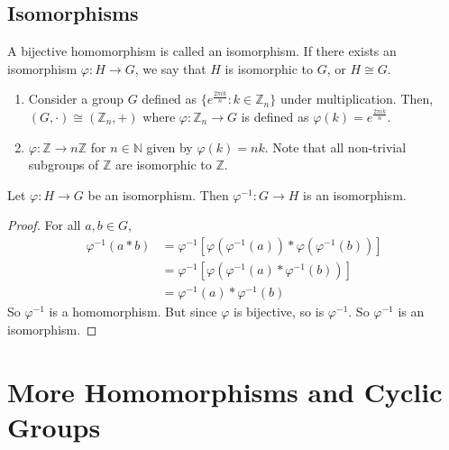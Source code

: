 \documentclass{article}
\begin{document}
\subsection{Isomorphisms}
A bijective homomorphism is called an isomorphism. If there exists an isomorphism $\varphi: H \to G$, we say that $H$ is isomorphic to $G$, or $H \cong G$.
\begin{enumerate}
    \item Consider a group $G$ defined as $\{ e^{\frac{2 \pi i k}{n}} : k \in \mathbb Z_n \}$ under multiplication. Then, $(G, \cdot) \cong (\mathbb Z_n, +)$ where $\varphi: \mathbb Z_n \to G$ is defined as $\varphi(k) = e^{\frac{2\pi i k}{n}}$.
    \item $\varphi: \mathbb Z \to n\mathbb Z$ for $n \in \mathbb N$ given by $\varphi(k) = nk$. Note that all non-trivial subgroups of $\mathbb Z$ are isomorphic to $\mathbb Z$.
\end{enumerate}

\begin{proposition}
    Let $\varphi: H \to G$ be an isomorphism. Then $\varphi^{-1}: G \to H$ is an isomorphism.
\end{proposition}
\begin{proof}
    For all $a, b \in G$,
    \begin{align*}
        \varphi^{-1}(a \ast b) & = \varphi^{-1}\left[ \varphi(\varphi^{-1}(a)) \ast \varphi(\varphi^{-1}(b)) \right] \\
                               & = \varphi^{-1}\left[ \varphi(\varphi^{-1}(a) \ast \varphi^{-1}(b)) \right]          \\
                               & = \varphi^{-1}(a) \ast \varphi^{-1}(b)
    \end{align*}
    So $\varphi^{-1}$ is a homomorphism. But since $\varphi$ is bijective, so is $\varphi^{-1}$. So $\varphi^{-1}$ is an isomorphism.
\end{proof}

\section{More Homomorphisms and Cyclic Groups}
\end{document}

